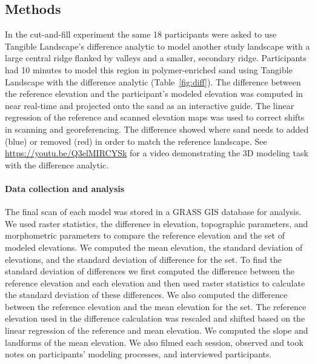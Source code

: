 \documentclass[Afour,sagev,times]{sagej} %
\begin{document}
\subsection{Methods}
In the cut-and-fill experiment 
the same 18 participants were asked to use 
Tangible Landscape's difference analytic to model 
another study landscape
with a large central ridge 
flanked by valleys 
and a smaller, secondary ridge.
Participants had 10 minutes to model this region
in polymer-enriched sand using Tangible Landscape 
with the difference analytic (Table~\ref{fig:diff}). 
The difference between the reference elevation 
and the participant's modeled elevation
was computed in near real-time and projected onto the sand 
as an interactive guide.
The linear regression of the reference and scanned elevation maps 
was used to correct shifts in scanning and georeferencing. 
The difference showed where 
sand needs to added (blue) or removed (red) 
in order to match the reference landscape.
See \url{https://youtu.be/Q3elMIRCYSk}
for a video demonstrating the 3D modeling task 
with the difference analytic.

\paragraph{Data collection and analysis}
The final scan of each model was stored in a 
GRASS GIS database for analysis. 
We used raster statistics, the difference in elevation, 
topographic parameters, and morphometric parameters
to compare the reference elevation 
and the set of modeled elevations. 
We computed 
the mean elevation,
the standard deviation of elevations, 
and the standard deviation of difference for the set.
To find the standard deviation of differences 
we first computed the difference 
between the reference elevation and each elevation 
and then used raster statistics 
to calculate the standard deviation of these differences.
We also computed the difference between the 
reference elevation and the mean elevation for the set. 
The reference elevation used in the difference calculation 
was rescaled and shifted based on the 
linear regression of the reference and mean elevation.
We computed the slope and landforms of the mean elevation. 
We also filmed each session, 
observed and took notes on participants' modeling processes, 
and interviewed participants.
\end{document}
